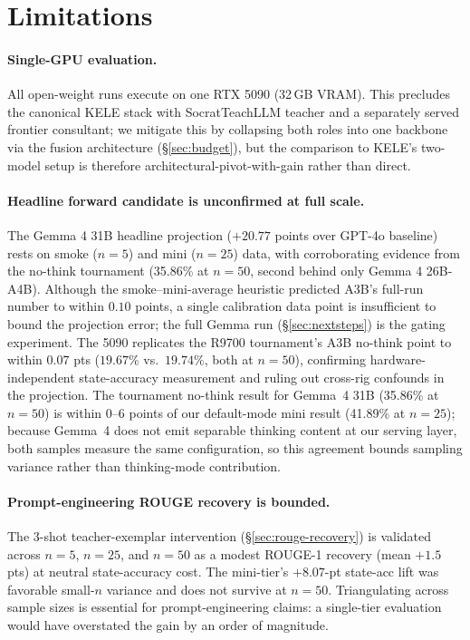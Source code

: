 \documentclass[11pt]{article}
\begin{document}
\section*{Limitations}

\paragraph{Single-GPU evaluation.} All open-weight runs execute on one RTX 5090 (32\,GB VRAM). This precludes the canonical KELE stack with SocratTeachLLM teacher and a separately served frontier consultant; we mitigate this by collapsing both roles into one backbone via the fusion architecture (\S\ref{sec:budget}), but the comparison to KELE's two-model setup is therefore architectural-pivot-with-gain rather than direct.

\paragraph{Headline forward candidate is unconfirmed at full scale.} The Gemma 4 31B headline projection ($\boldsymbol{+20.77}$ points over GPT-4o baseline) rests on smoke ($n{=}5$) and mini ($n{=}25$) data, with corroborating evidence from the no-think tournament (35.86\% at $n{=}50$, second behind only Gemma 4 26B-A4B). Although the smoke--mini-average heuristic predicted A3B's full-run number to within $0.10$ points, a single calibration data point is insufficient to bound the projection error; the full Gemma run (\S\ref{sec:nextsteps}) is the gating experiment. The 5090 replicates the R9700 tournament's A3B no-think point to within $0.07$ pts ($19.67\%$ vs.\ $19.74\%$, both at $n{=}50$), confirming hardware-independent state-accuracy measurement and ruling out cross-rig confounds in the projection. The tournament no-think result for Gemma~4 31B (35.86\% at $n{=}50$) is within $0$--$6$ points of our default-mode mini result (41.89\% at $n{=}25$); because Gemma~4 does not emit separable thinking content at our serving layer, both samples measure the same configuration, so this agreement bounds sampling variance rather than thinking-mode contribution.

\paragraph{Prompt-engineering ROUGE recovery is bounded.} The 3-shot teacher-exemplar intervention (\S\ref{sec:rouge-recovery}) is validated across $n{=}5$, $n{=}25$, and $n{=}50$ as a modest ROUGE-1 recovery (mean $+1.5$ pts) at neutral state-accuracy cost. The mini-tier's $+8.07$-pt state-acc lift was favorable small-$n$ variance and does not survive at $n{=}50$. Triangulating across sample sizes is essential for prompt-engineering claims: a single-tier evaluation would have overstated the gain by an order of magnitude.
\end{document}
